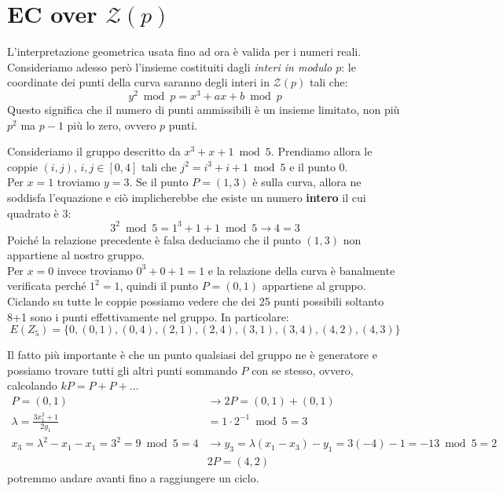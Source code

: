 \section{EC over \texorpdfstring{$\mathcal{Z}(p)$}{Zp}}
L'interpretazione geometrica usata fino ad ora è valida per i numeri reali. Consideriamo adesso però l'insieme costituiti dagli \textit{interi in modulo $p$}: le coordinate dei punti della curva saranno degli interi in $\mathcal{Z}(p)$ tali che:
\begin{equation}\label{eq:validecc}
    y^2\bmod{p}=x^3+ax+b\bmod{p}
\end{equation}
Questo significa che il numero di punti ammissibili è un insieme limitato, non più $p^2$ ma $p-1$ più lo zero, ovvero $p$ punti.
\begin{example} Consideriamo il gruppo descritto da $x^3+x+1\bmod5$. Prendiamo allora le coppie $(i,j),\,i,j\in[0,4]$ tali che $j^2=i^3+i+1\bmod5$ e il punto 0.\\
Per $x=1$ troviamo $y=3$. Se il punto $P=(1,3)$ è sulla curva, allora ne soddisfa l'equazione e ciò implicherebbe che esiste un numero \textbf{intero} il cui quadrato è 3: 
\[3^2\bmod5=1^3+1+1\bmod5\longrightarrow4=3\]
Poiché la relazione precedente è falsa deduciamo che il punto $(1,3)$ non appartiene al nostro gruppo.\\
Per $x=0$ invece troviamo $0^3+0+1=1$ e la relazione della curva è banalmente verificata perché $1^2=1$, quindi il punto $P=(0,1)$ appartiene al gruppo.\\
Ciclando su tutte le coppie possiamo vedere che dei 25 punti possibili soltanto 8+1 sono i punti effettivamente nel gruppo. In particolare:
\[E(Z_5)=\{0,(0,1),(0,4),(2,1),(2,4),(3,1),(3,4),(4,2),(4,3)\}\]
\begin{remark}
Il fatto più importante è che un punto qualsiasi del gruppo ne è generatore e possiamo trovare tutti gli altri punti sommando $P$ con se stesso, ovvero, calcolando $kP=P+P+\dots$
\begin{equation*}
    \begin{aligned}
    P=(0,1)&\longrightarrow2P=(0,1)+(0,1)\\
    \lambda=\frac{3x_1^2+1}{2y_1}&=1\cdot2^{-1}\bmod5=3\\
    x_3=\lambda^2-x_1-x_1=3^2=9\bmod5=4&\longrightarrow y_3=\lambda(x_1-x_3)-y_1=3(-4)-1=-13\bmod5=2\\
    &2P=(4,2)
    \end{aligned}
\end{equation*}
potremmo andare avanti fino a raggiungere un ciclo.
\end{remark}
\end{example}
